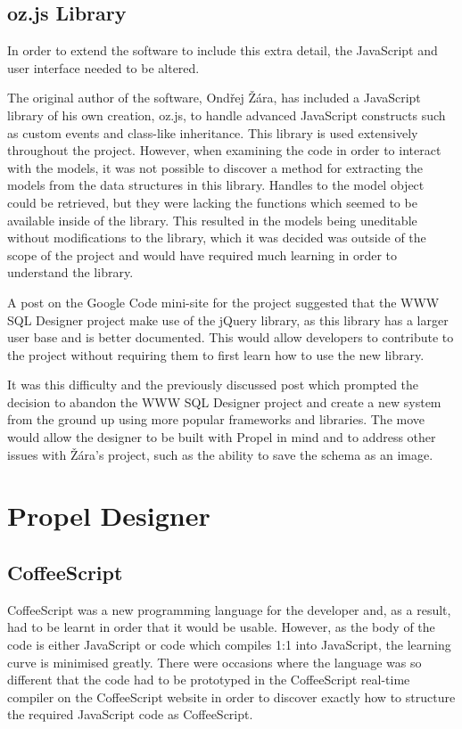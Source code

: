 \subsection{oz.js Library}
In order to extend the software to include this extra detail, the Java\-Script and user interface needed to be altered.

The original author of the software, Ond\v{r}ej \v{Z}\'{a}ra, has included a Java\-Script library of his own creation, oz.js, to handle advanced Java\-Script constructs such as custom events and class-like inheritance. This library is used extensively throughout the project. However, when examining the code in order to interact with the models, it was not possible to discover a method for extracting the models from the data structures in this library. Handles to the model object could be retrieved, but they were lacking the functions which seemed to be available inside of the library. This resulted in the models being uneditable without modifications to the library, which it was decided was outside of the scope of the project and would have required much learning in order to understand the library.

A post on the Google Code mini-site for the project suggested that the WWW SQL Designer project make use of the jQuery library, as this library has a larger user base and is better documented. This would allow developers to contribute to the project without requiring them to first learn how to use the new library.

It was this difficulty and the previously discussed post which prompted the decision to abandon the WWW SQL Designer project and create a new system from the ground up using more popular frameworks and libraries. The move would allow the designer to be built with Propel in mind and to address other issues with \v{Z}\'{a}ra's project, such as the ability to save the schema as an image.

\section{Propel Designer}\label{sec:PropelDesigner}
\subsection{CoffeeScript}
CoffeeScript was a new programming language for the developer and, as a result, had to be learnt in order that it would be usable. However, as the body of the code is either Java\-Script or code which compiles 1:1 into Java\-Script, the learning curve is minimised greatly. There were occasions where the language was so different that the code had to be prototyped in the Coffee\-Script real-time compiler on the Coffee\-Script website in order to discover exactly how to structure the required Java\-Script code as Coffee\-Script.

